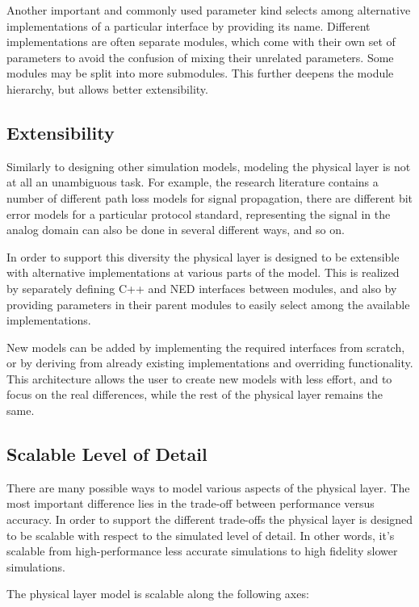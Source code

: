 Another important and commonly used parameter kind selects among alternative
implementations of a particular interface by providing its name. Different
implementations are often separate modules, which come with their own set of
parameters to avoid the confusion of mixing their unrelated parameters. Some
modules may be split into more submodules. This further deepens the module
hierarchy, but allows better extensibility.

\subsection{Extensibility}

Similarly to designing other simulation models, modeling the physical layer is
not at all an unambiguous task. For example, the research literature contains a
number of different path loss models for signal propagation, there are different
bit error models for a particular protocol standard, representing the signal in
the analog domain can also be done in several different ways, and so on.

In order to support this diversity the physical layer is designed to be
extensible with alternative implementations at various parts of the model. This
is realized by separately defining C++ and NED interfaces between modules, and
also by providing parameters in their parent modules to easily select among the
available implementations.

New models can be added by implementing the required interfaces from scratch, or
by deriving from already existing implementations and overriding functionality.
This architecture allows the user to create new models with less effort, and to
focus on the real differences, while the rest of the physical layer remains the
same.

\subsection{Scalable Level of Detail}

There are many possible ways to model various aspects of the physical layer.
The most important difference lies in the trade-off between performance versus
accuracy. In order to support the different trade-offs the physical layer is
designed to be scalable with respect to the simulated level of detail. In other
words, it's scalable from high-performance less accurate simulations to high
fidelity slower simulations.

The physical layer model is scalable along the following axes:

